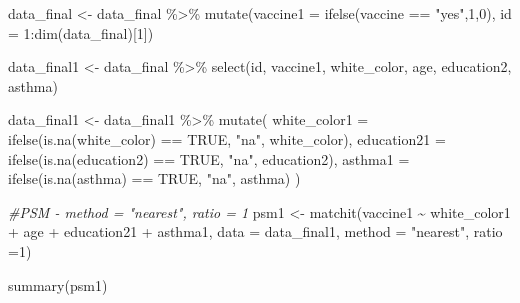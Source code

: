 \documentclass[
]{article}
\newenvironment{Shaded}{\begin{snugshade}}{\end{snugshade}}
\newcommand{\AttributeTok}[1]{\textcolor[rgb]{0.77,0.63,0.00}{#1}}
\newcommand{\CommentTok}[1]{\textcolor[rgb]{0.56,0.35,0.01}{\textit{#1}}}
\newcommand{\ConstantTok}[1]{\textcolor[rgb]{0.00,0.00,0.00}{#1}}
\newcommand{\DecValTok}[1]{\textcolor[rgb]{0.00,0.00,0.81}{#1}}
\newcommand{\FunctionTok}[1]{\textcolor[rgb]{0.00,0.00,0.00}{#1}}
\newcommand{\NormalTok}[1]{#1}
\newcommand{\OtherTok}[1]{\textcolor[rgb]{0.56,0.35,0.01}{#1}}
\newcommand{\SpecialCharTok}[1]{\textcolor[rgb]{0.00,0.00,0.00}{#1}}
\newcommand{\StringTok}[1]{\textcolor[rgb]{0.31,0.60,0.02}{#1}}
\begin{document}
\begin{Shaded}
\begin{Highlighting}[]
\NormalTok{data\_final }\OtherTok{\textless{}{-}}\NormalTok{ data\_final }\SpecialCharTok{\%\textgreater{}\%} 
  \FunctionTok{mutate}\NormalTok{(}\AttributeTok{vaccine1 =} \FunctionTok{ifelse}\NormalTok{(vaccine }\SpecialCharTok{==} \StringTok{"yes"}\NormalTok{,}\DecValTok{1}\NormalTok{,}\DecValTok{0}\NormalTok{),}
         \AttributeTok{id =} \DecValTok{1}\SpecialCharTok{:}\FunctionTok{dim}\NormalTok{(data\_final)[}\DecValTok{1}\NormalTok{]) }

\NormalTok{data\_final1 }\OtherTok{\textless{}{-}}\NormalTok{ data\_final }\SpecialCharTok{\%\textgreater{}\%} 
  \FunctionTok{select}\NormalTok{(id, vaccine1, white\_color, age, education2, asthma)}

\NormalTok{data\_final1 }\OtherTok{\textless{}{-}}\NormalTok{ data\_final1 }\SpecialCharTok{\%\textgreater{}\%} 
  \FunctionTok{mutate}\NormalTok{(}
    \AttributeTok{white\_color1 =} \FunctionTok{ifelse}\NormalTok{(}\FunctionTok{is.na}\NormalTok{(white\_color) }\SpecialCharTok{==} \ConstantTok{TRUE}\NormalTok{, }\StringTok{"na"}\NormalTok{, white\_color),}
    \AttributeTok{education21 =} \FunctionTok{ifelse}\NormalTok{(}\FunctionTok{is.na}\NormalTok{(education2) }\SpecialCharTok{==} \ConstantTok{TRUE}\NormalTok{, }\StringTok{"na"}\NormalTok{, education2),}
    \AttributeTok{asthma1 =} \FunctionTok{ifelse}\NormalTok{(}\FunctionTok{is.na}\NormalTok{(asthma) }\SpecialCharTok{==} \ConstantTok{TRUE}\NormalTok{, }\StringTok{"na"}\NormalTok{, asthma)}
\NormalTok{  )}
  
\CommentTok{\#PSM {-}  method = "nearest", ratio = 1}
\NormalTok{psm1 }\OtherTok{\textless{}{-}} \FunctionTok{matchit}\NormalTok{(vaccine1 }\SpecialCharTok{\textasciitilde{}}\NormalTok{ white\_color1 }\SpecialCharTok{+}\NormalTok{ age }\SpecialCharTok{+}\NormalTok{ education21 }\SpecialCharTok{+}\NormalTok{ asthma1, }\AttributeTok{data =}\NormalTok{ data\_final1, }\AttributeTok{method =} \StringTok{"nearest"}\NormalTok{, }\AttributeTok{ratio =}\DecValTok{1}\NormalTok{)}

\FunctionTok{summary}\NormalTok{(psm1)}
\end{Highlighting}
\end{Shaded}
\end{document}
